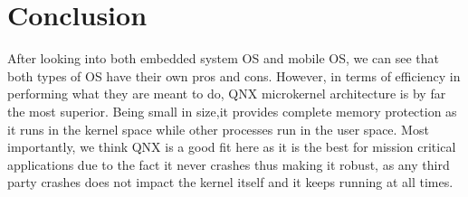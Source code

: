\documentclass[conference]{IEEEtran}
\begin{document}
\section{Conclusion}
After looking into both embedded system OS and mobile OS, we can see that both types of OS have their own pros and cons. However, in terms of efficiency in performing what they are meant to do, QNX microkernel architecture is by far the most superior. Being small in size,it provides complete memory protection as it runs in the kernel space while other processes run in the user space. Most importantly, we think QNX is a good fit here as it is the best for mission critical applications due to the fact it never crashes thus making it robust, as any third party crashes does not impact the kernel itself and it keeps running at all times\cite{quora}.



%
%

\end{document}
